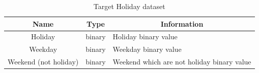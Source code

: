 \begin{figure}
\centering
{}
\end{figure}


\begin{table}[]
\centering
\caption{Target Holiday dataset}
\label{target_holidaydata}
\begin{tabular}{||c||l|l||}
\hline
Name                  & \multicolumn{1}{c|}{Type} & \multicolumn{1}{c||}{Information}           \\ \hline \hline
Holiday               & binary                    & Holiday binary value                       \\ \hline
Weekday               & binary                    & Weekday binary value                       \\ \hline
Weekend (not holiday) & binary                    & Weekend which are not holiday binary value \\ \hline
\end{tabular}
\end{table}



